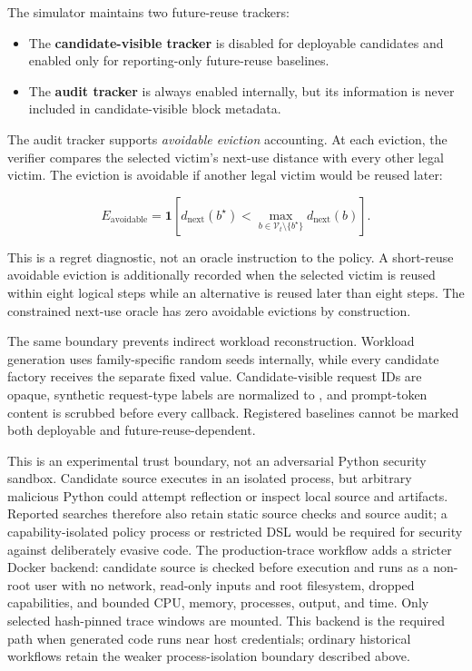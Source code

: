 \documentclass[11pt]{article}
\newcommand{\code}[1]{\texttt{\detokenize{#1}}}
\begin{document}
The simulator maintains two future-reuse trackers:

\begin{itemize}
  \item The \textbf{candidate-visible tracker} is disabled for deployable candidates and
  enabled only for reporting-only future-reuse baselines.
  \item The \textbf{audit tracker} is always enabled internally, but its information is
  never included in candidate-visible block metadata.
\end{itemize}

The audit tracker supports \emph{avoidable eviction} accounting.  At each eviction, the
verifier compares the selected victim's next-use distance with every other legal
victim.  The eviction is avoidable if another legal victim would be reused later:

\begin{equation}
  E_{\text{avoidable}} =
  \mathbf{1}\left[
  d_{\text{next}}(b^\star)
  < \max_{b\in\mathcal{V}_t\setminus\{b^\star\}}
      d_{\text{next}}(b)
  \right].
\end{equation}

This is a regret diagnostic, not an oracle instruction to the policy.  A
short-reuse avoidable eviction is additionally recorded when the selected victim is
reused within eight logical steps while an alternative is reused later than eight
steps.  The constrained next-use oracle has zero avoidable evictions by construction.

The same boundary prevents indirect workload reconstruction.  Workload generation uses
family-specific random seeds internally, while every candidate factory receives the
separate fixed \code{policy_seed} value.  Candidate-visible request IDs are opaque,
synthetic request-type labels are normalized to \code{request}, and prompt-token
content is scrubbed before every callback.  Registered baselines cannot be marked both
deployable and future-reuse-dependent.

This is an experimental trust boundary, not an adversarial Python security sandbox.
Candidate source executes in an isolated process, but arbitrary malicious Python could
attempt reflection or inspect local source and artifacts.  Reported searches therefore
also retain static source checks and source audit; a capability-isolated policy process
or restricted DSL would be required for security against deliberately evasive code.
The production-trace workflow adds a stricter Docker backend: candidate source is
checked before execution and runs as a non-root user with no network, read-only inputs
and root filesystem, dropped capabilities, and bounded CPU, memory, processes, output,
and time.  Only selected hash-pinned trace windows are mounted.  This backend is the
required path when generated code runs near host credentials; ordinary historical
workflows retain the weaker process-isolation boundary described above.
\end{document}
